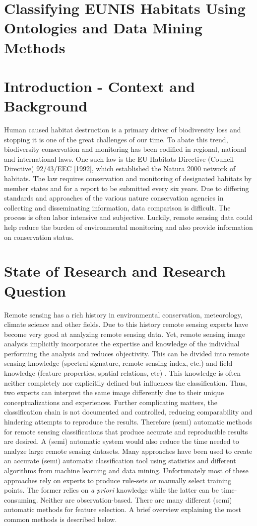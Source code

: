 \documentclass[a4paper,12pt]{article}
\begin{document}
\section{Classifying EUNIS Habitats Using Ontologies and Data Mining Methods}

\section{Introduction - Context and Background}
Human caused habitat destruction is a primary driver of biodiversity loss and
stopping it is one of the great challenges of our time. To abate this trend,
biodiversity conservation and monitoring has been codified in regional, national
and international laws. One such law is the EU Habitats Directive (Council
Directive) 92/43/EEC [1992], which established the Natura 2000 network of
habitats. The law requires conservation and monitoring of designated habitats by
member states and for a report to be submitted every six years. Due to differing
standards and approaches of the various nature conservation agencies in
collecting and disseminating information, data comparison is difficult. The
process is often labor intensive and subjective. Luckily, remote sensing data
could help reduce the burden of environmental monitoring and also provide
information on conservation status.

\section{State of Research and Research Question}
Remote sensing has a rich history in environmental conservation, meteorology,
climate science and other fields. Due to this history remote sensing experts
have become very good at analyzing remote sensing data. Yet, remote sensing
image analysis implicitly incorporates the expertise and knowledge of the
individual performing the analysis and reduces objectivity. This can be divided
into remote sensing knowledge (spectral signature, remote sensing index, etc.)
and field knowledge (feature properties, spatial relations, etc)
\cite{Andres2013a}. This knowledge is often neither completely nor explicitily
defined but influences the classification. Thus, two experts can interpret the
same image differently due to their unique conceptualizations and experiences.
Further complicating matters, the classification chain is not documented and
controlled, reducing comparability and hindering attempts to reproduce the
results\cite{Arvor2013}. Therefore (semi) automatic methods for remote sensing
classifications that produce accurate and reproducible results are desired.
A (semi) automatic system would also reduce the time needed to analyze large
remote sensing datasets. Many approaches have been used to create an accurate
(semi) automatic classification tool using statistics and different algorithms
from machine learning and data mining. Unfortunately most of these approaches
rely on experts to produce rule-sets or manually select training points. The
former relies on \emph{a priori} knowledge while the latter can be
time-consuming.
Neither are observation-based. There are many different (semi) automatic methods
for feature selection. A brief overview explaining the most common methods is
described below.
\end{document}
